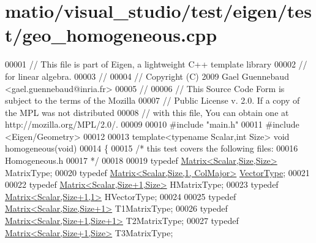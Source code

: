 \hypertarget{matio_2visual__studio_2test_2eigen_2test_2geo__homogeneous_8cpp_source}{}\section{matio/visual\+\_\+studio/test/eigen/test/geo\+\_\+homogeneous.cpp}
\label{matio_2visual__studio_2test_2eigen_2test_2geo__homogeneous_8cpp_source}

\begin{DoxyCode}
00001 \textcolor{comment}{// This file is part of Eigen, a lightweight C++ template library}
00002 \textcolor{comment}{// for linear algebra.}
00003 \textcolor{comment}{//}
00004 \textcolor{comment}{// Copyright (C) 2009 Gael Guennebaud <gael.guennebaud@inria.fr>}
00005 \textcolor{comment}{//}
00006 \textcolor{comment}{// This Source Code Form is subject to the terms of the Mozilla}
00007 \textcolor{comment}{// Public License v. 2.0. If a copy of the MPL was not distributed}
00008 \textcolor{comment}{// with this file, You can obtain one at http://mozilla.org/MPL/2.0/.}
00009 
00010 \textcolor{preprocessor}{#include "main.h"}
00011 \textcolor{preprocessor}{#include <Eigen/Geometry>}
00012 
00013 \textcolor{keyword}{template}<\textcolor{keyword}{typename} Scalar,\textcolor{keywordtype}{int} Size> \textcolor{keywordtype}{void} homogeneous(\textcolor{keywordtype}{void})
00014 \{
00015   \textcolor{comment}{/* this test covers the following files:}
00016 \textcolor{comment}{     Homogeneous.h}
00017 \textcolor{comment}{  */}
00018 
00019   \textcolor{keyword}{typedef} \hyperlink{group___core___module_class_eigen_1_1_matrix}{Matrix<Scalar,Size,Size>} MatrixType;
00020   \textcolor{keyword}{typedef} \hyperlink{group___core___module_class_eigen_1_1_matrix}{Matrix<Scalar,Size,1, ColMajor>} 
      \hyperlink{struct_vector_type}{VectorType};
00021 
00022   \textcolor{keyword}{typedef} \hyperlink{group___core___module_class_eigen_1_1_matrix}{Matrix<Scalar,Size+1,Size>} HMatrixType;
00023   \textcolor{keyword}{typedef} \hyperlink{group___core___module_class_eigen_1_1_matrix}{Matrix<Scalar,Size+1,1>} HVectorType;
00024 
00025   \textcolor{keyword}{typedef} \hyperlink{group___core___module_class_eigen_1_1_matrix}{Matrix<Scalar,Size,Size+1>}   T1MatrixType;
00026   \textcolor{keyword}{typedef} \hyperlink{group___core___module_class_eigen_1_1_matrix}{Matrix<Scalar,Size+1,Size+1>} T2MatrixType;
00027   \textcolor{keyword}{typedef} \hyperlink{group___core___module_class_eigen_1_1_matrix}{Matrix<Scalar,Size+1,Size>} T3MatrixType;

\end{DoxyCode}

